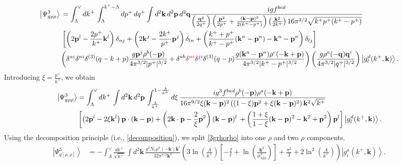 \documentclass[aps,prd,amsmath,amssymb,nofootinbib]{revtex4-2}
\numberwithin{equation}{section}
\begin{document}
\begin{align}\label{part2}
\left|\Psi_{g\rho\rho}^{3}\right\rangle \, & =\int_{\Lambda}^{\vee}dk^{+}\,\int_{\Lambda}^{k^{+}-\Lambda}dp^{+}\, dq^{+}\int d^{2}\mathbf{k}\, d^{2}\mathbf{p}\, d^{2}\mathbf{q}  \frac{igf^{bcd}}{\left(\frac{\mathbf{q}^{2}}{2q^{+}}\right)\left(\frac{\mathbf{p}^{2}}{2p^{+}}+\frac{(\mathbf{k}-\mathbf{p})^{2}}{2(k^{+}-p^{+})}\right)\left(\frac{\mathbf{k}^{2}}{2k^{+}}\right)16\pi^{3/2}\sqrt{k^{+}p^{+}(k^{+}-p^{+})}}\notag \\ &\left[\left(2\mathbf{p}^{l}-\frac{2p^{+}}{k^{+}}\mathbf{k}^{l}\right)\delta_{nj}+\left(2\mathbf{k}^{j}-\frac{2k^{+}}{p^{+}}\mathbf{p}^{j}\right)\delta_{ln}+\left(\frac{k^{+}+p^{+}}{k^{+}-p^{+}}(\mathbf{k}^{n}-\mathbf{p}^{n})-\mathbf{k}^{n}-\mathbf{p}^{n}\right)\delta_{lj}\right]\notag \\ &\bigg(\delta^{ac}\delta^{ni}\delta^{(3)}(q-k+p)\frac{g\mathbf{p}^{j}\rho^{b}(-\mathbf{p})}{4\pi^{3/2}|p^{+}|^{3/2}}+\delta^{ab}\textcolor{red}{\delta^{ni}}\textcolor{blue}{\delta^{ji}}\delta^{(3)}(q-p)\frac{g(\mathbf{k}^{n}-\mathbf{p}^{n})\rho^{c}(-\mathbf{k}+\mathbf{p})}{4\pi^{3/2}|k^{+}-p^{+}|^{3/2}}\bigg)\left(\frac{g\rho^{a}(-\mathbf{q})\mathbf{q}^{i}}{4\pi^{3/2}|q^{+}|^{3/2}}\right)\left|g_{l}^{d}(k^{+},\mathbf{k})\right\rangle.
\end{align}
Introducing $\xi = \frac{p^{+}}{k^{+}}$, we obtain
 \begin{align}\label{3grhorho}
\left|\Psi_{g\rho\rho}^{3}\right\rangle & =\int_{\Lambda}^{\vee}dk^{+}\,\int d^{2}\mathbf{k}\, d^{2}\mathbf{p}\,\int_{\frac{\Lambda}{k^{+}}}^{1-\frac{\Lambda}{k^{+}}}d\xi\,\frac{ig^{3}f^{bad}\rho^{b}(-\mathbf{p})\rho^{a}(-\mathbf{k}+\mathbf{p})}{16\pi^{9/2}\xi(\mathbf{k}-\mathbf{p})^{2}\left((1-\xi)\mathbf{p}^{2}+\xi(\mathbf{k}-\mathbf{p})^{2}\right)\mathbf{k}^{2}\sqrt{k^{+}}}\notag \\ & \left[\left(2\mathbf{p}^{l}-2\xi \mathbf{k}^{l}\right)\mathbf{p}\cdot(\mathbf{k}-\mathbf{p})+\left(2\mathbf{k}\cdot \mathbf{p}-\frac{2}{\xi}\mathbf{p}^{2}\right)(\mathbf{k}-\mathbf{p})^{l}\right.\left.+\left(\frac{1+\xi}{1-\xi}(\mathbf{k}-\mathbf{p})^{2}-\mathbf{k}^{2}+\mathbf{p}^{2}\right)\mathbf{p}^{l}\right]\left|g_{l}^{d}(k^{+},\mathbf{k})\right\rangle.
\end{align}
Using the decomposition principle (i.e., \eqref{decomposition}), we split \eqref{3grhorho} into one $\rho$ and two $\rho$ components.
\begin{align}\label{onerho2}
\left|\Psi_{g[\rho,\rho]}^{3}\right\rangle & = -\int_{\Lambda}^{\vee}\frac{dk^{+}}{\sqrt{k^{+}}}\,\int d^{2}\mathbf{k}\,\frac{g^{3}N_{c}\rho^{a}(-\mathbf{k})\mathbf{k}^{i}}{32\pi^{7/2}\mathbf{k}^{2}}\left(3\ln\left(\frac{\Lambda}{k^{+}}\right)\left[-\frac{2}{\epsilon}+\ln\left(\frac{\mathbf{k}^{2}}{\mu_{\overline{MS}}^{2}}\right)\right]+\frac{\pi^{2}}{3}+2\ln^{2}\left(\frac{\Lambda}{k^{+}}\right)\right)\left|g_{i}^{a}(k^{+},\mathbf{k})\right\rangle .
\end{align}
\end{document}
